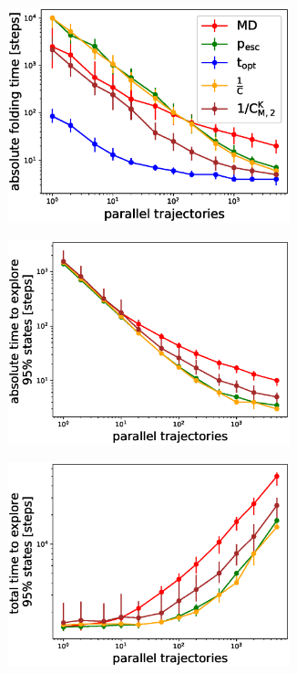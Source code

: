 \begin{figure}[H]
  \begin{subfigure}[t]{0.5\textwidth}
    \includegraphics[width=0.9\textwidth]{figures/GTT_6_steps10000_scaling_fold0.eps}    
  \end{subfigure}
  \begin{subfigure}[t]{0.5\textwidth}
    \includegraphics[width=0.9\textwidth]{figures/1FME_6_steps10000_scaling_explore.eps}
  \end{subfigure}
  \begin{subfigure}[t]{0.5\textwidth}
    \includegraphics[width=0.9\textwidth]{figures/1FME_6_steps10000_scaling_explore_total.eps}

\end{subfigure}
\end{figure}
